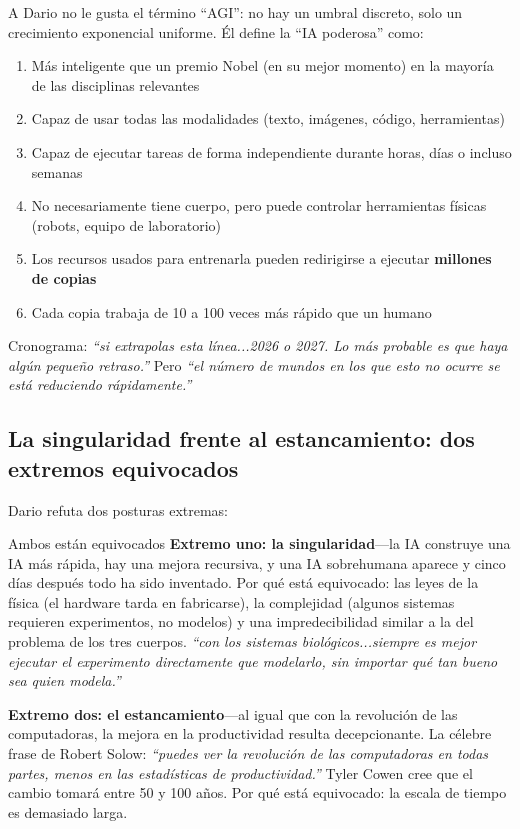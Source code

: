 A Dario no le gusta el término ``AGI'': no hay un umbral discreto, solo un crecimiento exponencial uniforme. Él define la ``IA poderosa'' como:

\begin{enumerate}
    \item Más inteligente que un premio Nobel (en su mejor momento) en la mayoría de las disciplinas relevantes
    \item Capaz de usar todas las modalidades (texto, imágenes, código, herramientas)
    \item Capaz de ejecutar tareas de forma independiente durante horas, días o incluso semanas
    \item No necesariamente tiene cuerpo, pero puede controlar herramientas físicas (robots, equipo de laboratorio)
    \item Los recursos usados para entrenarla pueden redirigirse a ejecutar \textbf{millones de copias}
    \item Cada copia trabaja de 10 a 100 veces más rápido que un humano
\end{enumerate}

Cronograma: \textit{``si extrapolas esta línea...2026 o 2027. Lo más probable es que haya algún pequeño retraso.''} Pero \textit{``el número de mundos en los que esto no ocurre se está reduciendo rápidamente.''}

\subsection{La singularidad frente al estancamiento: dos extremos equivocados}

Dario refuta dos posturas extremas:

\begin{warningbox}{Ambos están equivocados}
\textbf{Extremo uno: la singularidad}—la IA construye una IA más rápida, hay una mejora recursiva, y una IA sobrehumana aparece y cinco días después todo ha sido inventado. Por qué está equivocado: las leyes de la física (el hardware tarda en fabricarse), la complejidad (algunos sistemas requieren experimentos, no modelos) y una impredecibilidad similar a la del problema de los tres cuerpos. \textit{``con los sistemas biológicos...siempre es mejor ejecutar el experimento directamente que modelarlo, sin importar qué tan bueno sea quien modela.''}

\textbf{Extremo dos: el estancamiento}—al igual que con la revolución de las computadoras, la mejora en la productividad resulta decepcionante. La célebre frase de Robert Solow: \textit{``puedes ver la revolución de las computadoras en todas partes, menos en las estadísticas de productividad.''} Tyler Cowen cree que el cambio tomará entre 50 y 100 años. Por qué está equivocado: la escala de tiempo es demasiado larga.
\end{warningbox}

